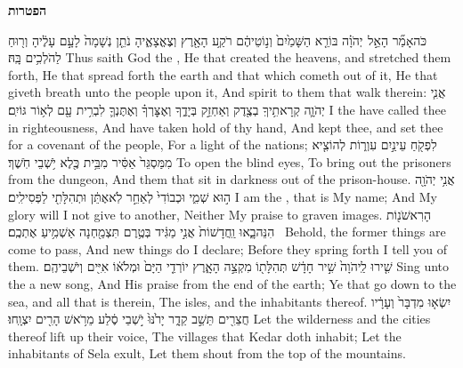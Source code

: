 \vspace{24pt}\LARGE \textbf{הפטרות} \normalsize\vspace{-16pt}
\label{haft_1}
\setcounter{chap}{42}
\setcounter{verse}{5}
{כֹּה\maqqaf אָמַ֞ר הָאֵ֣ל \pasek  יְהֹוָ֗ה בּוֹרֵ֤א הַשָּׁמַ֙יִם֙ וְנ֣וֹטֵיהֶ֔ם רֹקַ֥ע הָאָ֖רֶץ וְצֶאֱצָאֶ֑יהָ נֹתֵ֤ן נְשָׁמָה֙ לָעָ֣ם עָלֶ֔יהָ וְר֖וּחַ לַהֹלְכִ֥ים בָּֽהּ׃}
{Thus saith God the \lord, He that created the heavens, and stretched them forth, He that spread forth the earth and that which cometh out of it, He that giveth breath unto the people upon it, And spirit to them that walk therein:}
{אֲנִ֧י יְהֹוָ֛ה קְרָאתִ֥יךָֽ בְצֶ֖דֶק וְאַחְזֵ֣ק בְּיָדֶ֑ךָ וְאֶצׇּרְךָ֗ וְאֶתֶּנְךָ֛ לִבְרִ֥ית עָ֖ם לְא֥וֹר גּוֹיִֽם׃}
{I the \lord\space have called thee in righteousness, And have taken hold of thy hand, And kept thee, and set thee for a covenant of the people, For a light of the nations;}
{לִפְקֹ֖חַ עֵינַ֣יִם עִוְר֑וֹת לְהוֹצִ֤יא מִמַּסְגֵּר֙ אַסִּ֔יר מִבֵּ֥ית כֶּ֖לֶא יֹ֥שְׁבֵי חֹֽשֶׁךְ׃}
{To open the blind eyes, To bring out the prisoners from the dungeon, And them that sit in darkness out of the prison-house.}
{אֲנִ֥י יְהֹוָ֖ה ה֣וּא שְׁמִ֑י וּכְבוֹדִי֙ לְאַחֵ֣ר לֹֽא\maqqaf אֶתֵּ֔ן וּתְהִלָּתִ֖י לַפְּסִילִֽים׃}
{I am the \lord, that is My name; And My glory will I not give to another, Neither My praise to graven images.}
{הָרִאשֹׁנ֖וֹת הִנֵּה\maqqaf בָ֑אוּ וַֽחֲדָשׁוֹת֙ אֲנִ֣י מַגִּ֔יד בְּטֶ֥רֶם תִּצְמַ֖חְנָה אַשְׁמִ֥יעַ אֶתְכֶֽם׃ \petucha }
{Behold, the former things are come to pass, And new things do I declare; Before they spring forth I tell you of them.}
{שִׁ֤ירוּ לַֽיהֹוָה֙ שִׁ֣יר חָדָ֔שׁ תְּהִלָּת֖וֹ מִקְצֵ֣ה הָאָ֑רֶץ יוֹרְדֵ֤י הַיָּם֙ וּמְלֹא֔וֹ אִיִּ֖ים וְיֹשְׁבֵיהֶֽם׃}
{Sing unto the \lord\space a new song, And His praise from the end of the earth; Ye that go down to the sea, and all that is therein, The isles, and the inhabitants thereof.}
{יִשְׂא֤וּ מִדְבָּר֙ וְעָרָ֔יו חֲצֵרִ֖ים תֵּשֵׁ֣ב קֵדָ֑ר יָרֹ֙נּוּ֙ יֹ֣שְׁבֵי סֶ֔לַע מֵרֹ֥אשׁ הָרִ֖ים יִצְוָֽחוּ׃}
{Let the wilderness and the cities thereof lift up their voice, The villages that Kedar doth inhabit; Let the inhabitants of Sela exult, Let them shout from the top of the mountains.}
